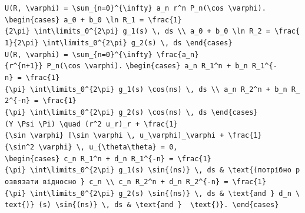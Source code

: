 \documentclass[
  ukrainian,
]{article}
\begin{document}
\texttt{U(R,\ \textbackslash{}varphi)\ =\ \textbackslash{}sum\_\{n=0\}\^{}\{\textbackslash{}infty\}\ a\_n\ r\^{}n\ P\_n(\textbackslash{}cos\ \textbackslash{}varphi).}
\texttt{\textbackslash{}begin\{cases\}\ a\_0\ +\ b\_0\ \textbackslash{}ln\ R\_1\ =\ \textbackslash{}frac\{1\}\{2\textbackslash{}pi\}\ \textbackslash{}int\textbackslash{}limits\_0\^{}\{2\textbackslash{}pi\}\ g\_1(s)\ \textbackslash{},\ ds\ \textbackslash{}\textbackslash{}\ a\_0\ +\ b\_0\ \textbackslash{}ln\ R\_2\ =\ \textbackslash{}frac\{1\}\{2\textbackslash{}pi\}\ \textbackslash{}int\textbackslash{}limits\_0\^{}\{2\textbackslash{}pi\}\ g\_2(s)\ \textbackslash{},\ ds\ \textbackslash{}end\{cases\}}
\texttt{U(R,\ \textbackslash{}varphi)\ =\ \textbackslash{}sum\_\{n=0\}\^{}\{\textbackslash{}infty\}\ \textbackslash{}frac\{a\_n\}\{r\^{}\{n+1\}\}\ P\_n(\textbackslash{}cos\ \textbackslash{}varphi).}
\texttt{\textbackslash{}begin\{cases\}\ a\_n\ R\_1\^{}n\ +\ b\_n\ R\_1\^{}\{-n\}\ =\ \textbackslash{}frac\{1\}\{\textbackslash{}pi\}\ \textbackslash{}int\textbackslash{}limits\_0\^{}\{2\textbackslash{}pi\}\ g\_1(s)\ \textbackslash{}cos(ns)\ \textbackslash{},\ ds\ \textbackslash{}\textbackslash{}\ a\_n\ R\_2\^{}n\ +\ b\_n\ R\_2\^{}\{-n\}\ =\ \textbackslash{}frac\{1\}\{\textbackslash{}pi\}\ \textbackslash{}int\textbackslash{}limits\_0\^{}\{2\textbackslash{}pi\}\ g\_2(s)\ \textbackslash{}cos(ns)\ \textbackslash{},\ ds\ \textbackslash{}end\{cases\}}
\texttt{(Y\ \textbackslash{}Psi\ \textbackslash{}Pi)\ \textbackslash{}quad\ (r\^{}2\ u\_r)\_r\ +\ \textbackslash{}frac\{1\}\{\textbackslash{}sin\ \textbackslash{}varphi\}\ {[}\textbackslash{}sin\ \textbackslash{}varphi\ \textbackslash{},\ u\_\textbackslash{}varphi{]}\_\textbackslash{}varphi\ +\ \textbackslash{}frac\{1\}\{\textbackslash{}sin\^{}2\ \textbackslash{}varphi\}\ \textbackslash{},\ u\_\{\textbackslash{}theta\textbackslash{}theta\}\ =\ 0,}
\texttt{\textbackslash{}begin\{cases\}\ c\_n\ R\_1\^{}n\ +\ d\_n\ R\_1\^{}\{-n\}\ =\ \textbackslash{}frac\{1\}\{\textbackslash{}pi\}\ \textbackslash{}int\textbackslash{}limits\_0\^{}\{2\textbackslash{}pi\}\ g\_1(s)\ \textbackslash{}sin\{(ns)\}\ \textbackslash{},\ ds\ \&\ \textbackslash{}text\{(потрібно\ розв\textquotesingle{}язати\ відносно\ \}\ c\_n\ \textbackslash{}\textbackslash{}\ c\_n\ R\_2\^{}n\ +\ d\_n\ R\_2\^{}\{-n\}\ =\ \textbackslash{}frac\{1\}\{\textbackslash{}pi\}\ \textbackslash{}int\textbackslash{}limits\_0\^{}\{2\textbackslash{}pi\}\ g\_2(s)\ \textbackslash{}sin\{(ns)\}\ \textbackslash{},\ ds\ \&\ \textbackslash{}text\{and\ \}\ d\_n\ \textbackslash{}text\{)\}\ (s)\ \textbackslash{}sin\{(ns)\}\ \textbackslash{},\ ds\ \&\ \textbackslash{}text\{and\ \}\ \ \textbackslash{}text\{)\}.\ \textbackslash{}end\{cases\}}
\end{document}
